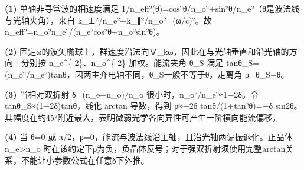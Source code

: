 \par\noindent\textbf{(1)} 单轴非寻常波的相速度满足 1/n\_eff²(θ)=cos²θ/n\_o²+sin²θ/n\_e²（θ是波法线与光轴夹角），来自 k\_⊥²/n\_e²+k\_∥²/n\_o²=(ω/c)²。故 n\_eff²=n\_o²n\_e²/(n\_e²cos²θ+n\_o²sin²θ)。
\par\noindent\textbf{(2)} 固定ω的波矢椭球上，群速度沿法向∇\_kω，因此在与光轴垂直和沿光轴的方向上分别按 n\_e\textasciicircum{}\{-2\}、n\_o\textasciicircum{}\{-2\} 加权。能流夹角 θ\_S 满足 tanθ\_S=(n\_o²/n\_e²)tanθ，因两主介电轴不同，θ\_S一般不等于θ，走离角 ρ=θ\_S−θ。
\par\noindent\textbf{(3)} 当相对双折射 δ=(n\_e−n\_o)/n\_o 很小时，n\_o²/n\_e²≈1−2δ。令 tanθ\_S≈(1−2δ)tanθ，线化 arctan 导数，得到 ρ≈−2δ tanθ/(1+tan²θ)=−δ sin2θ。其幅度在约45°附近最大，表明微弱光学各向异性可产生一阶横向能流偏移。
\par\noindent\textbf{(4)} 当 θ=0 或 π/2，ρ=0，能流与波法线沿主轴，且沿光轴两偏振退化。正晶体 n\_e>n\_o 时在该约定下ρ为负，负晶体反号；对于强双折射须使用完整arctan关系，不能让小参数公式在任意δ下外推。
